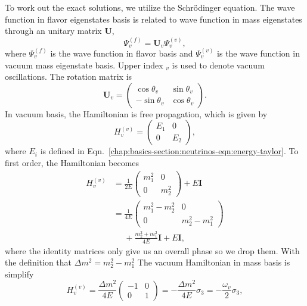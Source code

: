 To work out the exact solutions, we utilize the Schr\"{o}dinger equation. The wave function in flavor eigenstates basis is related to wave function in mass eigenstates through an unitary matrix $\mathbf U$,
\begin{equation}
\Psi_{v}^{(f)} = \mathbf{U}_{v}\Psi_{v}^{(v)},
\end{equation}
where $\Psi_{v}^{(f)}$ is the wave function in flavor basis and $\Psi_{v}^{(v)}$ is the wave function in vacuum mass eigenstate basis. Upper index ${}_{v}$ is used to denote vacuum oscillations. The rotation matrix is
\begin{equation}
\mathbf{U}_{v} = \begin{pmatrix} \cos\theta_v & \sin \theta_v \\ -\sin \theta_v & \cos \theta_v \end{pmatrix}.
\end{equation}
In vacuum basis, the Hamiltonian is free propagation, which is given by
\begin{equation}
H_v^{(v)} = \begin{pmatrix} E_1 & 0 \\
0 & E_2
\end{pmatrix},
\end{equation}
where $E_i$ is defined in Eqn.~\ref{chap:basics-section:neutrinos-eqn:energy-taylor}.
To first order, the Hamiltonian becomes
\begin{align*}
H_v^{(v)} &= \frac{1}{2E} \begin{pmatrix}
m_1^2 & 0 \\
0 & m_2^2
\end{pmatrix} + E \mathbf{I}\\
& =  \frac{1}{4E} \begin{pmatrix}
m_1^2 - m_2^2 & 0 \\
0 & m_2^2 - m_1^2
\end{pmatrix} \\
&\phantom{=}+ \frac{m_2^2 + m_1^2}{4E} \mathbf{I} + E \mathbf{I},
\end{align*}
where the identity matrices only give us an overall phase so we drop them. With the definition that $\Delta m^2 = m_2^2 - m_1^2$ The vacuum Hamiltonian in mass basis is simplify
\begin{equation}
H_v^{(v)} =  \frac{\Delta m^2}{4E} \begin{pmatrix}
-1 & 0 \\
0 & 1
\end{pmatrix} = -\frac{\Delta m^2}{4E} \sigma_3 = -\frac{\omega_{v}}{2}\sigma_3 ,
\end{equation}
